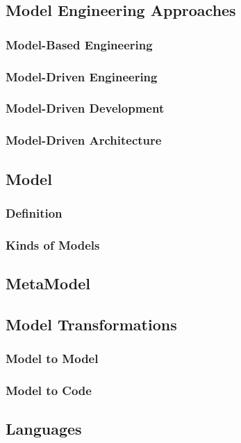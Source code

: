 \subsection{Model Engineering Approaches}

\subsubsection{Model-Based Engineering}
\subsubsection{Model-Driven Engineering}
\subsubsection{Model-Driven Development}
\subsubsection{Model-Driven Architecture}

\subsection{Model}
\subsubsection{Definition}
\subsubsection{Kinds of Models}

\subsection{MetaModel}

\subsection{Model Transformations}
\subsubsection{Model to Model}
\subsubsection{Model to Code}

\subsection{Languages}

